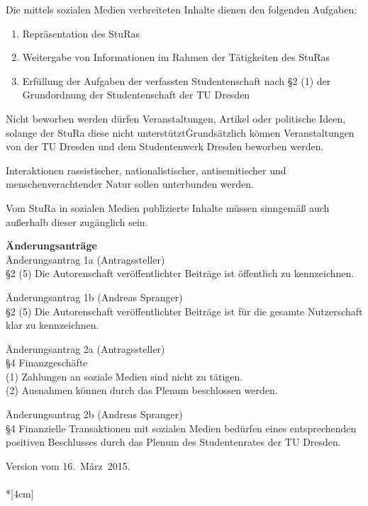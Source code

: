 \begin{multicols}{2}
\Abs \Satz Die mittels sozialen Medien verbreiteten Inhalte dienen den folgenden Aufgaben:
\begin{enumerate}
\item Repräsentation des StuRas
\item Weitergabe von Informationen im Rahmen der Tätigkeiten des StuRas
\item Erfüllung der Aufgaben der verfassten Studentenschaft nach §2 (1) der Grundordnung der Studentenschaft der TU Dresden
\end {enumerate}
\Abs \Satz Nicht beworben werden dürfen Veranstaltungen, Artikel oder politische Ideen, solange der StuRa diese nicht unterstützt\. Grundsätzlich können Veranstaltungen von der TU Dresden und dem Studentenwerk Dresden beworben werden.

\Abs \Satz Interaktionen rassistischer, nationalistischer, antisemitischer und menschenverachtender Natur sollen unterbunden werden. 

\Abs \Satz Vom StuRa in sozialen Medien publizierte Inhalte müssen sinngemäß auch außerhalb dieser zugänglich sein.

\end{multicols}

\textbf{Änderungsanträge}\\
Änderungsantrag 1a (Antragssteller)\\
§2 (5) Die Autorenschaft veröffentlichter Beiträge ist öffentlich zu kennzeichnen.

Änderungsantrag 1b (Andreas Spranger)\\
§2 (5) Die Autorenschaft veröffentlichter Beiträge ist für die gesamte Nutzerschaft klar zu kennzeichnen.

Änderungsantrag 2a (Antragssteller)\\
§4 Finanzgeschäfte\\
(1) Zahlungen an soziale Medien sind nicht zu tätigen.\\
(2) Ausnahmen können durch das Plenum beschlossen werden.

Änderungsantrag 2b (Andreas Spranger)\\
§4 Finanzielle Transaktionen mit sozialen Medien bedürfen eines entsprechenden positiven Beschlusses durch das Plenum des Studentenrates der TU Dresden.

\nopagebreak
\vspace{1cm}
Version vom 16.~März~2015.
\\



\normalsize
~\\*[4cm]
\begin{center}
\hspace*{\fill}
\hspace*{\fill}
\end{center}